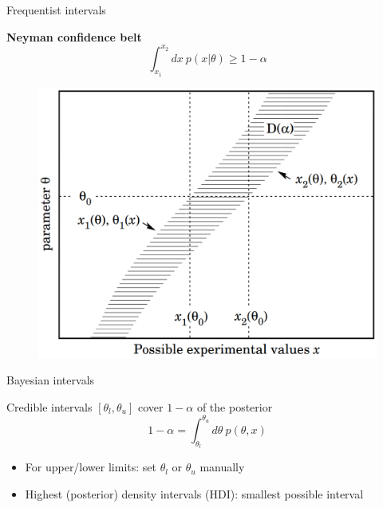 \documentclass[
aspectratio=169,
14pt,
professionalfonts
]{beamer}
\begin{document}
\begin{frame}{Frequentist intervals}

\begin{minipage}[t]{0.49\linewidth}
\textbf{Neyman confidence belt}
$$
\int_{x_1}^{x_2} dx ~ p(x|\theta) \geq 1-\alpha
$$
\end{minipage}
\begin{minipage}[t]{0.49\linewidth}
\begin{figure}
    \centering
    \includegraphics[width=\linewidth]{../plots/neyman.png}
\end{figure}
\end{minipage}
    
\end{frame}

\begin{frame}{Bayesian intervals}

Credible intervals $[\theta_l, \theta_u]$ cover $1-\alpha$ of the posterior
$$
1-\alpha = \int_{\theta_l}^{\theta_u} d\theta ~ p(\theta, x)
$$
\begin{itemize}
    \item For upper/lower limits: set $\theta_l$ or $\theta_u$ manually
    \item Highest (posterior) density intervals (HDI): smallest possible interval
\end{itemize}
\end{frame}
\end{document}
